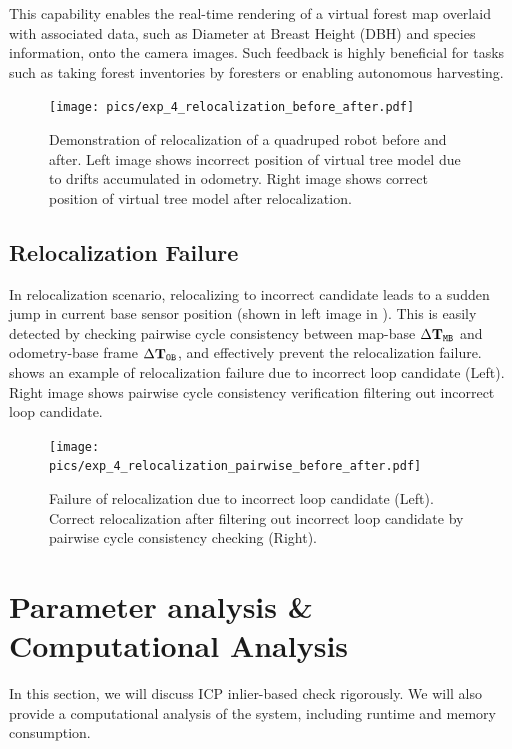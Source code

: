 This capability enables the real-time rendering of a virtual forest map overlaid with associated data, such as Diameter at Breast Height (DBH) and species information, onto the camera images. Such feedback is highly beneficial for tasks such as taking forest inventories by foresters or enabling autonomous harvesting.
\begin{figure}[htbp]
  \centering
  \texttt{[image: pics/exp\_4\_relocalization\_before\_after.pdf]}
  \caption{Demonstration of relocalization of a quadruped robot before and after. Left image shows incorrect position of virtual tree model due to drifts accumulated in odometry. Right image shows correct position of virtual tree model after relocalization.}
  \label{fig:relocalization_before_after}
\end{figure}

\subsection*{Relocalization Failure}
In relocalization scenario, relocalizing to incorrect candidate leads to a sudden jump in current base sensor position (shown in left image in ). This is easily detected by checking pairwise cycle consistency between map-base $\Delta\mathbf{T}_{\mathtt{M}\mathtt{B}}$ and odometry-base frame $\Delta\mathbf{T}_{\mathtt{O}\mathtt{B}}$, and effectively prevent the relocalization failure.  shows an example of relocalization failure due to incorrect loop candidate (Left). Right image shows pairwise cycle consistency verification filtering out incorrect loop candidate.
\begin{figure}[htbp]
  \centering
  \texttt{[image: pics/exp\_4\_relocalization\_pairwise\_before\_after.pdf]}
  \caption{Failure of relocalization due to incorrect loop candidate (Left). Correct relocalization after filtering out incorrect loop candidate by pairwise cycle consistency checking (Right).}
  \label{fig:relocalization_pairwise_cycle_consistency}
\end{figure}


\section{Parameter analysis \& Computational Analysis}
In this section, we will discuss ICP inlier-based check rigorously. We will also provide a computational analysis of the system, including runtime and memory consumption. 

